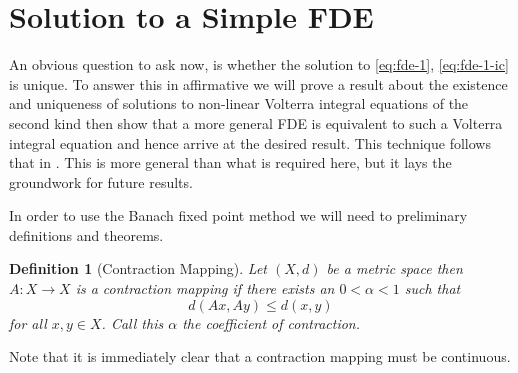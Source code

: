 \documentclass{article}
\begin{document}
\setlength\parindent{0pt}
\setlength{\parskip}{5mm plus4mm minus3mm}
\fancyfoot[r]{\today}
\newtheorem{theorem}{Theorem}
\newtheorem{lemma}{Lemma}
\newtheorem{definition}{Definition}
\newtheorem{corollary}{Corollary}
\newcommand{\laplace}[1]{ \mathcal{L} \left\{ #1 \right\} }
\newcommand{\rld}[3]{ \left( \mathcal{D}_{#1}^{#2} #3 \right) }
\newcommand{\rli}[3]{ \left( I_{#1}^{#2} #3 \right) }
\newcommand{\der}[3]{ \frac{d^{#3}#1}{d#2^{#3}} }
\newcommand{\capder}[3]{ \left( \prescript{C}{}{\mathcal{D}_{#1}^{#2}} #3 \right) }
\section*{Solution to a Simple FDE}

An obvious question to ask now, is whether the solution to \eqref{eq:fde-1}, \eqref{eq:fde-1-ic} is unique. To answer this in 
affirmative we will prove a result about the existence and uniqueness of solutions to non-linear Volterra integral equations of the second kind
then show that a more general FDE is equivalent to such a Volterra integral equation and hence arrive at the desired result. 
This technique follows that in \cite{Diethelm2002}. This 
is more general than what is required here, but it lays the groundwork for future results.

In order to use the Banach fixed point method we will need to preliminary definitions and theorems. 

\begin{definition}[Contraction Mapping]
Let $ (X,d) $ be a metric space then $ A : X \longrightarrow X $ is a contraction mapping if there exists
an $ 0 < \alpha < 1 $ such that
$$
	d(Ax,Ay) \leq d(x,y) 
$$
for all $ x, y \in X $. Call this $ \alpha $ the coefficient of contraction. 
\end{definition}

Note that it is immediately clear that a contraction mapping must be continuous.
\end{document}

